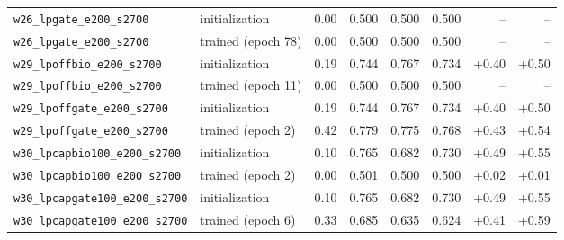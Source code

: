 \begin{table}[H]
\begin{tabular}{@{}llrrrrrr@{}}
    \texttt{w26\_lpgate\_e200\_s2700} & initialization & 0.00 & 0.500 & 0.500 & 0.500 & -- & -- \\
    \texttt{w26\_lpgate\_e200\_s2700} & trained (epoch 78) & 0.00 & 0.500 & 0.500 & 0.500 & -- & -- \\
    \texttt{w29\_lpoffbio\_e200\_s2700} & initialization & 0.19 & 0.744 & 0.767 & 0.734 & +0.40 & +0.50 \\
    \texttt{w29\_lpoffbio\_e200\_s2700} & trained (epoch 11) & 0.00 & 0.500 & 0.500 & 0.500 & -- & -- \\
    \texttt{w29\_lpoffgate\_e200\_s2700} & initialization & 0.19 & 0.744 & 0.767 & 0.734 & +0.40 & +0.50 \\
    \texttt{w29\_lpoffgate\_e200\_s2700} & trained (epoch 2) & 0.42 & 0.779 & 0.775 & 0.768 & +0.43 & +0.54 \\
    \texttt{w30\_lpcapbio100\_e200\_s2700} & initialization & 0.10 & 0.765 & 0.682 & 0.730 & +0.49 & +0.55 \\
    \texttt{w30\_lpcapbio100\_e200\_s2700} & trained (epoch 2) & 0.00 & 0.501 & 0.500 & 0.500 & +0.02 & +0.01 \\
    \texttt{w30\_lpcapgate100\_e200\_s2700} & initialization & 0.10 & 0.765 & 0.682 & 0.730 & +0.49 & +0.55 \\
    \texttt{w30\_lpcapgate100\_e200\_s2700} & trained (epoch 6) & 0.33 & 0.685 & 0.635 & 0.624 & +0.41 & +0.59 \\
    \hline
  \end{tabular}
\end{table}
